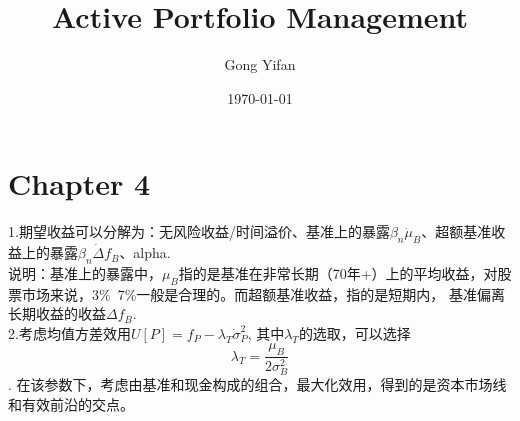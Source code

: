 \documentclass{article}
\title{Active Portfolio Management}
\author{Gong Yifan}
\date{\today}
\begin{document}
\maketitle
\tableofcontents

\section{Chapter 4}
1.期望收益可以分解为：无风险收益/时间溢价、基准上的暴露$\beta_n\dot\mu_B$、超额基准收益上的暴露$\beta_n\dot\Delta{f_B}$、alpha.\\
说明：基准上的暴露中，$\mu_B$指的是基准在非常长期（70年+）上的平均收益，对股票市场来说，3\%~7\%一般是合理的。而超额基准收益，指的是短期内，
基准偏离长期收益的收益$\Delta{f_B}.$\\
2.考虑均值方差效用$U[P] = f_P - \lambda_T\dot\sigma^2_P$, 其中$\lambda_T$的选取，可以选择$$\lambda_T = \frac{\mu_B}{2\sigma^2_B}$$. 
在该参数下，考虑由基准和现金构成的组合，最大化效用，得到的是资本市场线和有效前沿的交点。
\end{document}
